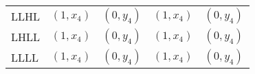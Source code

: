 \begin{tabular}{lrrrr}
LLHL  & \multicolumn{1}{l}{$( 1 , x_4 )$} & \multicolumn{1}{l}{$( 0 , y_4 )$} & \multicolumn{1}{l}{$( 1 , x_4 )$} & \multicolumn{1}{l}{$( 0 , y_4 )$} \\
LHLL  & \multicolumn{1}{l}{$( 1 , x_4 )$} & \multicolumn{1}{l}{$( 0 , y_4 )$} & \multicolumn{1}{l}{$( 1 , x_4 )$} & \multicolumn{1}{l}{$( 0 , y_4 )$} \\
LLLL  & \multicolumn{1}{l}{$( 1 , x_4 )$} & \multicolumn{1}{l}{$( 0 , y_4 )$} & \multicolumn{1}{l}{$( 1 , x_4 )$} & \multicolumn{1}{l}{$( 0 , y_4 )$} \\
\bottomrule
\end{tabular}%
